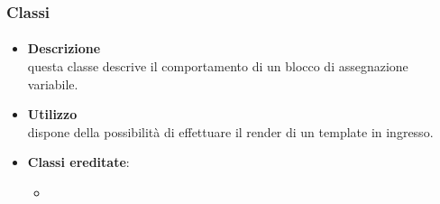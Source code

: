 \subsubsection{Classi}
\paragraph{}
\label{\nogloxy{SWEDesigner::Server::Project::ParsedAssignment}}
\begin{itemize}
\item \textbf{Descrizione}\\
questa classe descrive il comportamento di un blocco di assegnazione variabile.	
\item \textbf{Utilizzo}\\
dispone della possibilità di effettuare il render di un template in ingresso.
\item \textbf{Classi ereditate}:
\begin{itemize}
\item \hyperref[\nogloxy{SWEDesigner::Server::Project::ParsedInstruction}]{}
\end{itemize}
\end{itemize}

